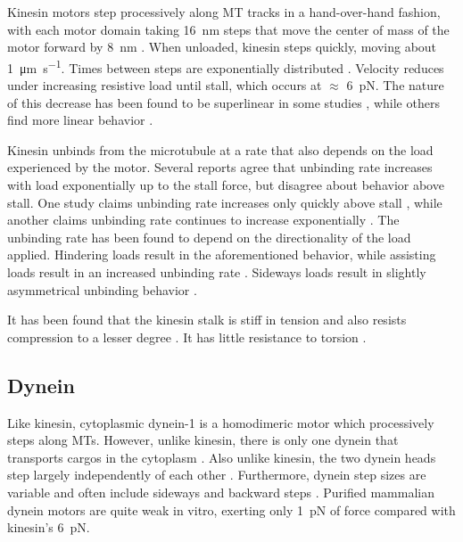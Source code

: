 Kinesin motors step processively along MT tracks in a hand-over-hand fashion, with each motor domain taking \SI{16}{\nano\meter} steps \cite{Yildiz2004} that move the center of mass of the motor forward by \SI{8}{\nano\meter} \cite{Svoboda1993}. When unloaded, kinesin steps quickly, moving about \SI{1}{\micro\meter\per\second}. Times between steps are exponentially distributed \cite{Carter2005}. Velocity reduces under increasing resistive load until stall, which occurs at $\approx$ \SI{6}{\pico\newton}. The nature of this decrease has been found to be superlinear in some studies \cite{Kunwar2010,Visscher1999,Fallesen2011,Rai2013}, while others find more linear behavior \cite{Svoboda1994,Andreasson2015a}.

Kinesin unbinds from the microtubule at a rate that also depends on the load experienced by the motor. Several reports agree that unbinding rate increases with load exponentially up to the stall force, but disagree about behavior above stall. One study claims unbinding rate increases only quickly above stall \cite{Kunwar2011}, while another claims unbinding rate continues to increase exponentially \cite{Andreasson2015a}. The unbinding rate has been found to depend on the directionality of the load applied. Hindering loads result in the aforementioned behavior, while assisting loads result in an increased unbinding rate \cite{Milic2014,Andreasson2015a}. Sideways loads result in slightly asymmetrical unbinding behavior \cite{Block2003}.

It has been found that the kinesin stalk is stiff in tension \cite{Kojima1997} and also resists compression to a lesser degree \cite{Jeney2004}. It has little resistance to torsion \cite{Hunt1993,Gutierrez-Medina2009}.

\subsection{Dynein}

Like kinesin, cytoplasmic dynein-1 is a homodimeric motor which processively steps along MTs. However, unlike kinesin, there is only one dynein that transports cargos in the cytoplasm \cite{Bhabha2016}. Also unlike kinesin, the two dynein heads step largely independently of each other \cite{DeWitt2012}. Furthermore, dynein step sizes are variable and often include sideways and backward steps \cite{Bhabha2016}. Purified mammalian dynein motors are quite weak in vitro, exerting only \SI{1}{\pico\newton} of force \cite{Mallik2004} compared with kinesin's \SI{6}{\pico\newton}.

